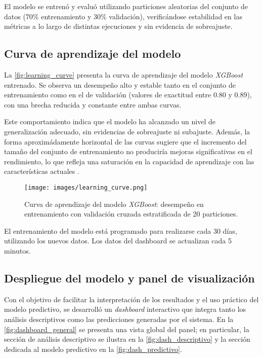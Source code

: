 \documentclass[12pt]{article}
\begin{document}
El modelo se entrenó y evaluó utilizando particiones aleatorias del conjunto de datos (70\% entrenamiento y 30\% validación), verificándose estabilidad en las métricas a lo largo de distintas ejecuciones y sin evidencia de sobreajuste.

\subsection{Curva de aprendizaje del modelo}

La \autoref{fig:learning_curve} presenta la curva de aprendizaje del modelo \textit{XGBoost} entrenado. Se observa un desempeño alto y estable tanto en el conjunto de entrenamiento como en el de validación (valores de exactitud entre 0.80 y 0.89), con una brecha reducida y constante entre ambas curvas.

Este comportamiento indica que el modelo ha alcanzado un nivel de generalización adecuado, sin evidencias de sobreajuste ni subajuste. Además, la forma aproximádamente horizontal de las curvas sugiere que el incremento del tamaño del conjunto de entrenamiento no produciría mejoras significativas en el rendimiento, lo que refleja una saturación en la capacidad de aprendizaje con las características actuales \parencite{raschka2018, chen2015}.

\begin{figure}[H]
    \centering
    \texttt{[image: images/learning\_curve.png]}
    \caption{Curva de aprendizaje del modelo \textit{XGBoost}: desempeño en entrenamiento con validación cruzada estratificada de 20 particiones.}
    \label{fig:learning_curve}
\end{figure}

El entrenamiento del modelo está programado para realizarse cada 30 días, utilizando los nuevos datos. Los datos del dashboard se actualizan cada 5 minutos.

\subsection{Despliegue del modelo y panel de visualización}

Con el objetivo de facilitar la interpretación de los resultados y el uso práctico del modelo predictivo, se desarrolló un \textit{dashboard} interactivo que integra tanto los análisis descriptivos como las predicciones generadas por el sistema. En la \autoref{fig:dashboard_general} se presenta una vista global del panel; en particular, la sección de análisis descriptivo se ilustra en la \autoref{fig:dash_descriptivo} y la sección dedicada al modelo predictivo en la \autoref{fig:dash_predictivo}.
\end{document}
